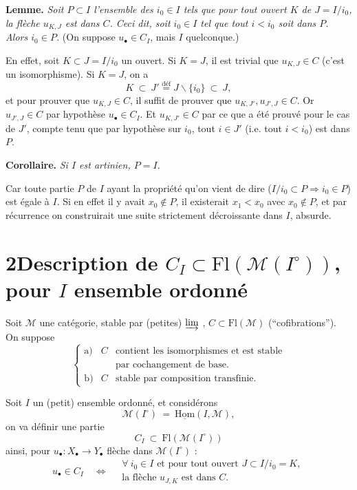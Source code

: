 \documentclass[11pt]{article}
\newcommand{\printedpage}[1]{\marginpar{\footnotesize p.~#1}}
\newcommand{\msp}[1]{\marginpar{\footnotesize [#1]}}
\newcommand{\Fl}{\mathrm{Fl}}
\newcommand{\M}{\mathcal{M}}
\begin{document}
\printedpage{14}

\msp{page 24}

\textbf{Lemme.} \textit{Soit $P \subset I$ l'ensemble des $i_0 \in I$ tels que pour tout ouvert $K$ de $J = I/i_0$, la flèche $u_{K,J}$ est dans $C$. Ceci dit, soit $i_0 \in I$ tel que tout $i < i_0$ soit dans $P$. Alors $i_0 \in P$.} (On suppose $u_\bullet \in C_I$, mais $I$ quelconque.)

En effet, soit $K \subset J = I/i_0$ un ouvert. Si $K = J$, il est trivial que $u_{K,J} \in C$ (c'est un isomorphisme). Si $K = J$, on a %
\[
K \ \subset\ J' \overset{\text{déf}}{=} J\backslash\{i_0\} \ \subset\ J,
\]
et pour prouver que $u_{K,J} \in C$, il suffit de prouver que $u_{K,J'}, u_{J',J} \in C$. Or $u_{J',J} \in C$ par hypothèse $u_\bullet \in C_I$. Et $u_{K,J'} \in C$ par ce que a été prouvé pour le cas de $J'$, compte tenu que par hypothèse sur $i_0$, tout $i \in J'$ (i.e. tout $i < i_0$) est dans $P$. %

\textbf{Corollaire.} \textit{Si $I$ est artinien, $P = I$.}

Car toute partie $P$ de $I$ ayant la propriété qu'on vient de dire ($I/i_0 \subset P \Longrightarrow i_0 \in P$) est égale à $I$. Si en effet il y avait $x_0 \notin P$, il existerait $x_1 < x_0$ avec $x_0 \notin P$, et par récurrence on construirait une suite strictement décroissante dans $I$, absurde. %

\msp{page 25}

\section*{2\quad Description de $C_I \subset \Fl(\M(I^\circ))$, pour $I$ ensemble ordonné}

Soit $\M$ une catégorie, stable par (petites) $\varinjlim$ , $C \subset \Fl(\M)$ (“cofibrations”). On suppose
\[
\left\{
\begin{array}{lll}
\text{a)} & C & \text{contient les isomorphismes et est stable}\\
 & & \text{par cochangement de base.}\\[1ex]
\text{b)} & C & \text{stable par composition transfinie.}
\end{array}
\right.
\tag*{(2.1)}
\]

Soit $I$ un (petit) ensemble ordonné, et considérons
\[
\M(I^\circ) \ =\ \underline{\mathrm{Hom}}(I,\M),
\]
on va définir une partie
\[
C_I \ \subset\ \Fl(\M(I^\circ))
\]
ainsi, pour $u_\bullet : X_\bullet \longrightarrow Y_\bullet$ flèche dans $\M(I^\circ)$ :
\[
u_\bullet \in C_I \quad\Longleftrightarrow\quad
\begin{array}{l}
\forall\ i_0 \in I \text{ et pour tout ouvert } J \subset I/i_0 = K,\\
\text{la flèche } u_{J,K} \text{ est dans } C.
\end{array}
\tag*{(2.2)}
\]
\end{document}
